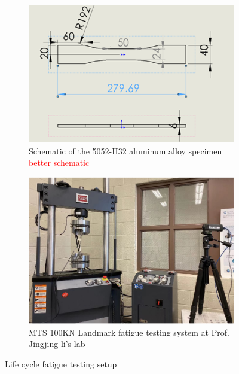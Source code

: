 \begin{figure}[tb]
  \centering
  \begin{subfigure}[t]{0.49\linewidth}
    \includegraphics[height=0.7\textwidth]{fig/specimen_dim.png}
    \caption{Schematic of the 5052-H32 aluminum alloy specimen \textcolor{red}{better schematic}}
    \label{fig: specimen dim}
  \end{subfigure}
  \begin{subfigure}[t]{0.49\linewidth}
    \includegraphics[height=0.7\textwidth]{fig/fatigue_testing_machine.png}
    \caption{MTS 100KN Landmark fatigue testing system at Prof. Jingjing li's lab}
    \label{fig: fatigue testing machine}
  \end{subfigure}

  \caption{Life cycle fatigue testing setup}
  \label{fig: fatigue testing setup}
\end{figure}

